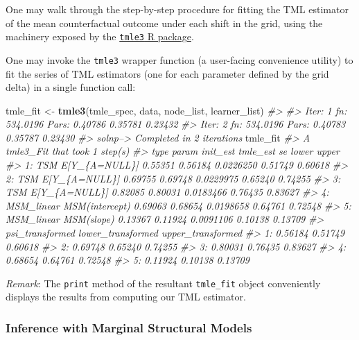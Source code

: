 \documentclass[12pt, krantz2,]{krantz}
\newenvironment{Shaded}{\begin{snugshade}}{\end{snugshade}}
\newcommand{\CommentTok}[1]{\textcolor[rgb]{0.37,0.37,0.37}{\textit{#1}}}
\newcommand{\KeywordTok}[1]{\textcolor[rgb]{0.27,0.27,0.27}{\textbf{#1}}}
\newcommand{\NormalTok}[1]{#1}
\newcommand{\StringTok}[1]{\textcolor[rgb]{0.5,0.5,0.5}{#1}}
\theoremstyle{definition}
\theoremstyle{definition}
\theoremstyle{definition}
\newcommand{\1}{\mathbbm{1}}
\begin{document}
One may walk through the step-by-step procedure for fitting the TML estimator
of the mean counterfactual outcome under each shift in the grid, using the
machinery exposed by the \href{https://tmle3.tlverse.org/}{\texttt{tmle3} R package}.

One may invoke the \texttt{tmle3} wrapper function (a user-facing convenience utility)
to fit the series of TML estimators (one for each parameter defined by the grid
delta) in a single function call:

\begin{Shaded}
\begin{Highlighting}[]
\NormalTok{tmle_fit <-}\StringTok{ }\KeywordTok{tmle3}\NormalTok{(tmle_spec, data, node_list, learner_list)}
\CommentTok{#> }
\CommentTok{#> Iter: 1 fn: 534.0196  Pars:  0.40786 0.35781 0.23432}
\CommentTok{#> Iter: 2 fn: 534.0196  Pars:  0.40783 0.35787 0.23430}
\CommentTok{#> solnp--> Completed in 2 iterations}
\NormalTok{tmle_fit}
\CommentTok{#> A tmle3_Fit that took 1 step(s)}
\CommentTok{#>          type          param init_est tmle_est        se   lower   upper}
\CommentTok{#> 1:        TSM  E[Y_\{A=NULL\}]  0.55351  0.56184 0.0226250 0.51749 0.60618}
\CommentTok{#> 2:        TSM  E[Y_\{A=NULL\}]  0.69755  0.69748 0.0229975 0.65240 0.74255}
\CommentTok{#> 3:        TSM  E[Y_\{A=NULL\}]  0.82085  0.80031 0.0183466 0.76435 0.83627}
\CommentTok{#> 4: MSM_linear MSM(intercept)  0.69063  0.68654 0.0198658 0.64761 0.72548}
\CommentTok{#> 5: MSM_linear     MSM(slope)  0.13367  0.11924 0.0091106 0.10138 0.13709}
\CommentTok{#>    psi_transformed lower_transformed upper_transformed}
\CommentTok{#> 1:         0.56184           0.51749           0.60618}
\CommentTok{#> 2:         0.69748           0.65240           0.74255}
\CommentTok{#> 3:         0.80031           0.76435           0.83627}
\CommentTok{#> 4:         0.68654           0.64761           0.72548}
\CommentTok{#> 5:         0.11924           0.10138           0.13709}
\end{Highlighting}
\end{Shaded}

\emph{Remark}: The \texttt{print} method of the resultant \texttt{tmle\_fit} object conveniently
displays the results from computing our TML estimator.

\hypertarget{inference-with-marginal-structural-models}{%
\subsubsection{Inference with Marginal Structural Models}\label{inference-with-marginal-structural-models}}
\end{document}
